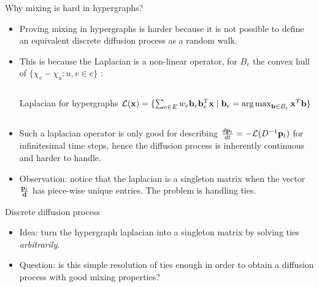 \documentclass[../main.tex]{subfiles}
\begin{document}
    \begin{frame}{Why mixing is hard in hypergraphs?} 
        \begin{itemize}
        	\item Proving mixing in hypergraphs is harder because it is not possible to define an equivalent discrete diffusion process as a random walk.
        	\item This is because the Laplacian is a non-linear operator, for $B_e$ the convex hull of $\{\chi_v-\chi_u : u,v\in e\}$ \cite{continuous_laplacian_hypergraph}:
	        	\begin{columns}
	        		\begin{block}{Laplacian for hypergraphs}
	        			$ \mathcal{L}(\bold{x}) = \{\sum_{e\in E} w_e \bold{b}_e\bold{b}_e^T \bold{x} \mid \bold{b}_e = \operatorname*{arg\,max}_{\bold{b}\in B_e} \bold{x}^T\bold{b} \}$
	        		\end{block}
	        	\end{columns}
	        \item Such a laplacian operator is only good for describing $\frac{d \bold{p}_t}{d t} = -\mathcal{L}(D^{-1}\bold{p}_t)$ for infinitesimal time steps, hence the diffusion process is inherently continuous and harder to handle.
	        \item Observation: notice that the laplacian is a singleton matrix when the vector $\frac{\bold{p}_t}{\bold{d}}$ has piece-wise unique entries. The problem is handling ties. 	
        \end{itemize}
    \end{frame}
		
	\begin{frame}{Discrete diffusion process}
		\begin{itemize}
			\item Idea: turn the hypergraph laplacian into a singleton matrix by solving ties \textit{arbitrarily}. 
			\item Question: is this simple resolution of ties enough in order to obtain a diffusion process with good mixing properties?
		\end{itemize}
	\end{frame}
\end{document}

